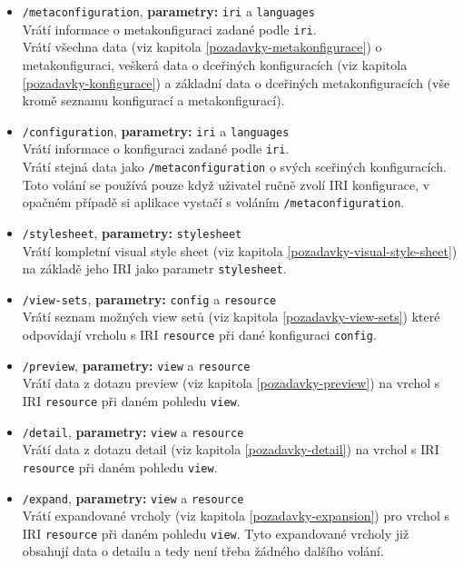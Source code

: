 \begin{itemize}
    \item \texttt{/metaconfiguration}, \textbf{parametry:} \texttt{iri} a \texttt{languages} \\
    Vrátí informace o metakonfiguraci zadané podle \texttt{iri}. \\
    Vrátí všechna data (viz kapitola \ref{pozadavky-metakonfigurace}) o metakonfiguraci, veškerá data o dceřiných konfiguracích (viz kapitola \ref{pozadavky-konfigurace}) a základní data o dceřiných metakonfiguracích (vše kromě seznamu konfigurací a metakonfigurací).

    \item \texttt{/configuration}, \textbf{parametry:} \texttt{iri} a \texttt{languages} \\
    Vrátí informace o konfiguraci zadané podle \texttt{iri}. \\
    Vrátí stejná data jako \texttt{/metaconfiguration} o svých sceřiných konfiguracích. \\
    Toto volání se používá pouze když uživatel ručně zvolí IRI konfigurace, v opačném případě si aplikace vystačí s voláním \texttt{/metaconfiguration}.

    \item \texttt{/stylesheet}, \textbf{parametry:} \texttt{stylesheet} \\
    Vrátí kompletní visual style sheet (viz kapitola \ref{pozadavky-visual-style-sheet}) na základě jeho IRI jako parametr \texttt{stylesheet}.

    \item \texttt{/view-sets}, \textbf{parametry:} \texttt{config} a \texttt{resource} \\
    Vrátí seznam možných view setů (viz kapitola \ref{pozadavky-view-sets}) které odpovídají vrcholu s IRI \texttt{resource} při dané konfiguraci \texttt{config}.

    \item \texttt{/preview}, \textbf{parametry:} \texttt{view} a \texttt{resource} \\
    Vrátí data z dotazu preview (viz kapitola \ref{pozadavky-preview}) na vrchol s IRI \texttt{resource} při daném pohledu \texttt{view}.

    \item \texttt{/detail}, \textbf{parametry:} \texttt{view} a \texttt{resource} \\
    Vrátí data z dotazu detail (viz kapitola \ref{pozadavky-detail}) na vrchol s IRI \texttt{resource} při daném pohledu \texttt{view}.

    \item \texttt{/expand}, \textbf{parametry:} \texttt{view} a \texttt{resource} \\
    Vrátí expandované vrcholy (viz kapitola \ref{pozadavky-expansion}) pro vrchol s IRI \texttt{resource} při daném pohledu \texttt{view}. Tyto expandované vrcholy již obsahují data o detailu a tedy není třeba žádného dalšího volání.
\end{itemize}
